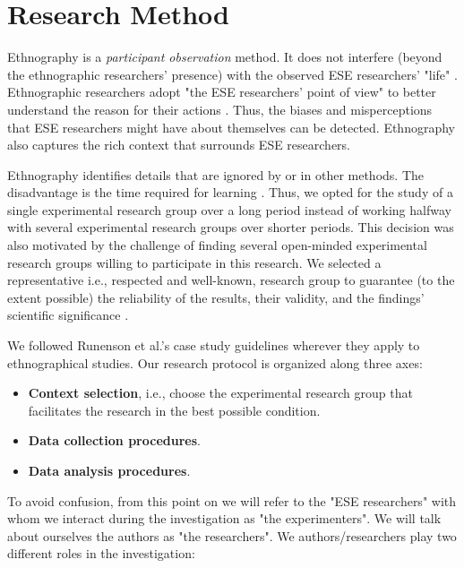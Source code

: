 \section{Research Method}\label{sec-research-method}
Ethnography is a \textit{participant observation} method. It does not interfere (beyond the ethnographic researchers' presence) with the observed ESE researchers' "life" \cite{Sharp-2016-Ethnographic-Studies-ESE}. Ethnographic researchers adopt "the ESE researchers' point of view" to better understand the reason for their actions \cite[pp. 55-56]{Outhwaite-2007-sage}. Thus, the biases and misperceptions that ESE researchers might have about themselves can be detected. Ethnography also captures the rich context that surrounds ESE researchers.

Ethnography identifies details that are ignored by or in other methods. The disadvantage is the time required for learning \cite{Sharp-2016-Ethnographic-Studies-ESE}. Thus, we opted for the study of a single experimental research group over a long period instead of working halfway with several experimental research groups over shorter periods. This decision was also motivated by the challenge of finding several open-minded experimental research groups willing to participate in this research. We selected a representative i.e., respected and well-known, research group to guarantee (to the extent possible) the reliability of the results, their validity, and the findings' scientific significance \cite{sjoberg-2007-future-empical-methods}.

We followed Runenson et al.'s case study guidelines \cite{Runenson-2012-case-study-SE} wherever they apply to ethnographical studies. Our research protocol is organized along three axes:

\begin{itemize}
	\item \textbf{Context selection}, i.e., choose the experimental research group that facilitates the research in the best possible condition.
    \item \textbf{Data collection procedures}.
    \item \textbf{Data analysis procedures}.
\end{itemize}

To avoid confusion, from this point on we will refer to the "ESE researchers" with whom we interact during the investigation as "the experimenters". We will talk about ourselves the authors as "the researchers". We authors/researchers play two different roles in the investigation:

